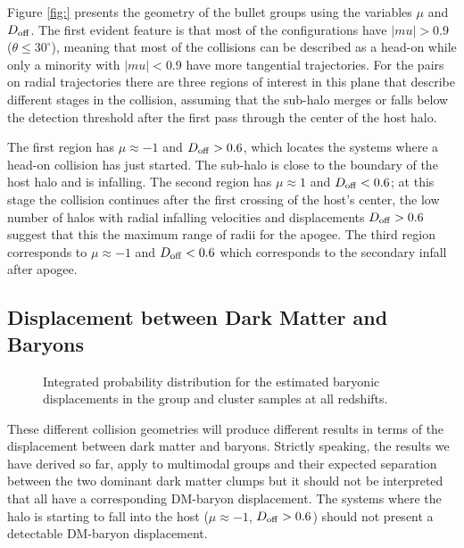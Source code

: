 \documentclass{emulateapj}
\begin{document}
Figure \ref{fig:} presents the geometry of the bullet groups using the 
variables $\mu$ and $D_{\rm off}$. The first evident feature is that
most of the configurations have $|mu|>0.9$ ($\theta\leq 30^{\circ}$),
meaning that most of the collisions can be described as a head-on while
only a minority with $|mu|<0.9$ have more tangential trajectories. For
the pairs on radial trajectories there are three regions of interest
in this plane that describe different stages in the collision,
assuming that the sub-halo merges or falls below the detection
threshold after the first pass through the center of the host halo.


The first region has $\mu\approx-1$ and $D_{\rm off}>0.6$, which
locates the systems where a head-on collision has just started. The
sub-halo is close to the boundary of the host halo and is
infalling. The second region has $\mu\approx 1$ and $D_{\rm off}<0.6$;
at this stage the collision continues after the first crossing of the
host's center, the low number of halos with radial infalling velocities
and displacements $D_{\rm off}>0.6$ suggest that this the maximum
range of radii for the apogee.  The third region corresponds to
$\mu\approx-1$ and $D_{\rm off}<0.6$ which corresponds to the
secondary infall after apogee. 



\subsection{Displacement between Dark Matter and Baryons}
\label{sec:baryonic_displacements}

\begin{figure}
\begin{center}
\end{center}
\caption{Integrated probability distribution for the estimated
  baryonic displacements in the group and cluster samples at all redshifts.}
\label{fig:baryonic_displacements}
\end{figure}

These different collision geometries will produce different results in
terms of the displacement between dark matter and baryons. Strictly
speaking, the results we have derived so far, apply to multimodal groups and their
expected separation between the two dominant dark matter clumps but it
should not be interpreted that all have a corresponding DM-baryon
displacement. The systems where the halo is starting to fall into the
host ($\mu\approx-1$, $D_{\rm off}>0.6$) should not present a
detectable DM-baryon displacement. 
\end{document}
